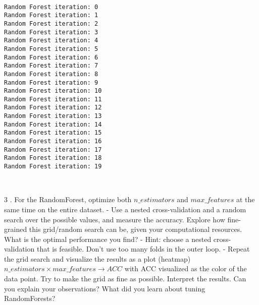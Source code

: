 \documentclass[11pt]{article}
\begin{document}
    \begin{center}
    \end{center}
    { \hspace*{\fill} \\}
    
    \begin{Verbatim}[commandchars=\\\{\}]
Random Forest iteration: 0 
Random Forest iteration: 1 
Random Forest iteration: 2 
Random Forest iteration: 3 
Random Forest iteration: 4 
Random Forest iteration: 5 
Random Forest iteration: 6 
Random Forest iteration: 7 
Random Forest iteration: 8 
Random Forest iteration: 9 
Random Forest iteration: 10 
Random Forest iteration: 11 
Random Forest iteration: 12 
Random Forest iteration: 13 
Random Forest iteration: 14 
Random Forest iteration: 15 
Random Forest iteration: 16 
Random Forest iteration: 17 
Random Forest iteration: 18 
Random Forest iteration: 19 

    \end{Verbatim}

    \begin{center}
    \end{center}
    { \hspace*{\fill} \\}
    
    3 . For the RandomForest, optimize both \(n\_estimators\) and
\(max\_features\) at the same time on the entire dataset. - Use a nested
cross-validation and a random search over the possible values, and
measure the accuracy. Explore how fine-grained this grid/random search
can be, given your computational resources. What is the optimal
performance you find? - Hint: choose a nested cross-validation that is
feasible. Don't use too many folds in the outer loop. - Repeat the grid
search and visualize the results as a plot (heatmap)
\(n\_estimators \times max\_features \rightarrow ACC\) with ACC
visualized as the color of the data point. Try to make the grid as fine
as possible. Interpret the results. Can you explain your observations?
What did you learn about tuning RandomForests?
\end{document}
